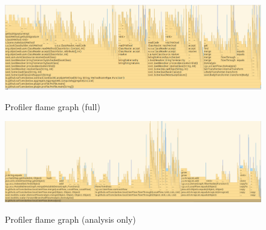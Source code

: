 \begin{figure}
  \caption{Profiler flame graph (full)}
  \includegraphics[scale=0.33]{screenshot20201231183130.png}
  \label{fig:flame-graph-full}
\end{figure}

\begin{figure}
  \caption{Profiler flame graph (analysis only)}
  \includegraphics[scale=0.3]{screenshot20201231183716.png}
  \label{fig:flame-graph-analysis}
\end{figure}
